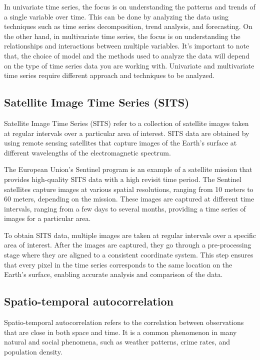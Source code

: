 In univariate time series, the focus is on understanding the patterns and trends of a single variable over time. This can be done by analyzing the data using techniques such as time series decomposition, trend analysis, and forecasting.
On the other hand, in multivariate time series, the focus is on understanding the relationships and interactions between multiple variables. 
It's important to note that, the choice of model and the methods used to analyze the data will depend on the type of time series data you are working with. Univariate and multivariate time series require different approach and techniques to be analyzed.

\subsection{Satellite Image Time Series (SITS)}

Satellite Image Time Series (SITS) refer to a collection of satellite images taken at regular intervals over a particular area of interest. 
SITS data are obtained by using remote sensing satellites that capture images of the Earth's surface at different wavelengths of the electromagnetic spectrum.

The European Union's Sentinel program is an example of a satellite mission that provides high-quality SITS data with a high revisit time period.
The Sentinel satellites capture images at various spatial resolutions, ranging from 10 meters to 60 meters, depending on the mission. 
These images are captured at different time intervals, ranging from a few days to several months, providing a time series of images for a particular area.

To obtain SITS data, multiple images are taken at regular intervals over a specific area of interest. 
After the images are captured, they go through a pre-processing stage where they are aligned to a consistent coordinate system. 
This step ensures that every pixel in the time series corresponds to the same location on the Earth's surface, enabling accurate analysis and comparison of the data.

\subsection{Spatio-temporal autocorrelation}
Spatio-temporal autocorrelation \cite{doi:10.1080/10095020.2019.1643609} refers to the correlation between observations that are close in both space and time. 
It is a common phenomenon in many natural and social phenomena, such as weather patterns, crime rates, and population density.

